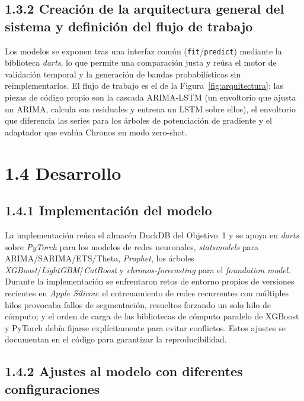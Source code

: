 \documentclass[12pt,letterpaper]{report}
\begin{document}
\subsection{1.3.2 Creación de la arquitectura general del sistema y definición del flujo de trabajo}

Los \factNModels{} modelos se exponen tras una interfaz común (\texttt{fit}/\texttt{predict})
mediante la biblioteca \textit{darts}, lo que permite una comparación justa y reúsa
el motor de validación temporal y la generación de bandas probabilísticas sin
reimplementarlos. El flujo de trabajo es el de la Figura~\ref{fig:arquitectura}: las
piezas de código propio son la cascada ARIMA-LSTM (un envoltorio que ajusta un ARIMA,
calcula sus residuales y entrena un LSTM sobre ellos), el envoltorio que diferencia las
series para los árboles de potenciación de gradiente y el adaptador que evalúa Chronos
en modo zero-shot.

\section{1.4 Desarrollo}

\subsection{1.4.1 Implementación del modelo}

La implementación reúsa el almacén DuckDB del Objetivo~1 y se apoya en
\textit{darts} sobre \textit{PyTorch} para los modelos de redes neuronales,
\textit{statsmodels} para ARIMA/SARIMA/ETS/Theta, \textit{Prophet}, los árboles
\textit{XGBoost}/\textit{LightGBM}/\textit{CatBoost} y \textit{chronos-forecasting} para
el \textit{foundation model}. Durante
la implementación se enfrentaron retos de entorno propios de versiones recientes en
\textit{Apple Silicon}: el entrenamiento de redes recurrentes con múltiples hilos
provocaba fallos de segmentación, resueltos forzando un solo hilo de cómputo; y el
orden de carga de las bibliotecas de cómputo paralelo de XGBoost y PyTorch debía
fijarse explícitamente para evitar conflictos. Estos ajustes se documentan en el
código para garantizar la reproducibilidad.

\subsection{1.4.2 Ajustes al modelo con diferentes configuraciones}
\end{document}
